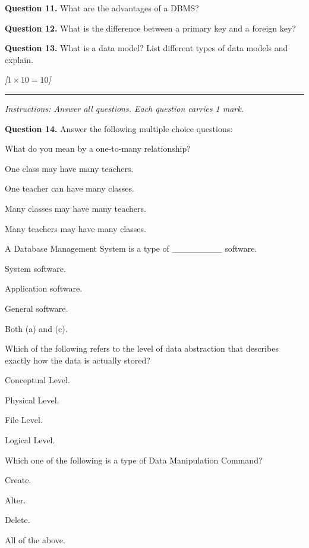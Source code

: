 \documentclass[11pt,a4paper]{article}
\newcommand{\pts}[1]{\hfill\textit{[#1]}}
\begin{document}
\medskip\noindent\textbf{Question 11.} What are the advantages of a DBMS?

\medskip\noindent\textbf{Question 12.} What is the difference between a primary key and a foreign key?

\medskip\noindent\textbf{Question 13.} What is a data model? List different types of data models and explain.

\bigskip{}\pts{$1 \times 10 = 10$}
\rule{\linewidth}{0.4pt}\smallskip

\noindent\textit{Instructions: Answer all questions. Each question carries 1 mark.}

\medskip\noindent\textbf{Question 14.} Answer the following multiple choice questions:
\begin{parts}
  \item What do you mean by a one-to-many relationship?
  \begin{parts}
    \item One class may have many teachers.
    \item One teacher can have many classes.
    \item Many classes may have many teachers.
    \item Many teachers may have many classes.
  \end{parts}

  \item A Database Management System is a type of \_\_\_\_\_\_\_\_ software.
  \begin{parts}
    \item System software.
    \item Application software.
    \item General software.
    \item Both (a) and (c).
  \end{parts}

  \item Which of the following refers to the level of data abstraction that describes exactly how the data is actually stored?
  \begin{parts}
    \item Conceptual Level.
    \item Physical Level.
    \item File Level.
    \item Logical Level.
  \end{parts}

  \item Which one of the following is a type of Data Manipulation Command?
  \begin{parts}
    \item Create.
    \item Alter.
    \item Delete.
    \item All of the above.
  \end{parts}


\end{parts}
\end{document}
